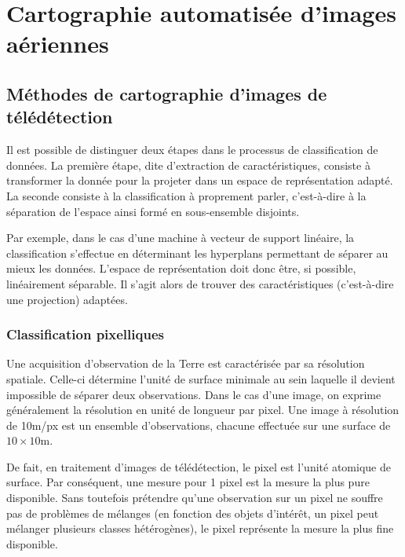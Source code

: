 \chapter{Cartographie automatisée d'images aériennes}
	\citationChap{}{}
	\minitoc
	\newpage


\section{Méthodes de cartographie d'images de télédétection}

Il est possible de distinguer deux étapes dans le processus de classification de données. La première étape, dite d'extraction de caractéristiques, consiste à transformer la donnée pour la projeter dans un espace de représentation adapté. La seconde consiste à la classification à proprement parler, c'est-à-dire à la séparation de l'espace ainsi formé en sous-ensemble disjoints.

Par exemple, dans le cas d'une machine à vecteur de support linéaire, la classification s'effectue en déterminant les hyperplans permettant de séparer au mieux les données. L'espace de représentation doit donc être, si possible, linéairement séparable. Il s'agit alors de trouver des caractéristiques (c'est-à-dire une projection) adaptées.

\subsection{Classification pixelliques}

Une acquisition d'observation de la Terre est caractérisée par sa résolution spatiale. Celle-ci détermine l'unité de surface minimale au sein laquelle il devient impossible de séparer deux observations. Dans le cas d'une image, on exprime généralement la résolution en unité de longueur par pixel. Une image à résolution de 10m/px est un ensemble d'observations, chacune effectuée sur une surface de $10\times10$m.

De fait, en traitement d'images de télédétection, le pixel est l'unité atomique de surface. Par conséquent, une mesure pour 1 pixel est la mesure la plus pure disponible. Sans toutefois prétendre qu'une observation sur un pixel ne souffre pas de problèmes de mélanges (en fonction des objets d'intérêt, un pixel peut mélanger plusieurs classes hétérogènes), le pixel représente la mesure la plus fine disponible.

